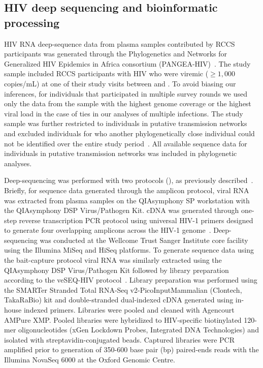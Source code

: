 \documentclass[10pt,letterpaper]{article}
\newcommand{\var}[1]{\DTLfetch{\mydata}{labels}{#1}{vals}}
\begin{document}
\subsection{HIV deep sequencing and bioinformatic processing}
HIV RNA deep-sequence data from plasma samples contributed by RCCS participants was generated through the Phylogenetics and Networks for Generalized HIV Epidemics in Africa consortium (PANGEA-HIV)~\cite{pillay2015,abeler-dorner2019}. The study sample included RCCS participants with HIV who were viremic ($\ge1,000$ copies/mL) at one of their study visits between \var{min_survey_date} and \var{max_survey_date}. To avoid biasing our inferences, for individuals that participated in multiple survey rounds we used only the data from the sample with the highest genome coverage or the highest viral load in the case of ties in our analyses of multiple infections. The study sample was further restricted to individuals in putative transmission networks and excluded individuals for who another phylogenetically close individual could not be identified over the entire study period~\cite{monod2024}. All available sequence data for individuals in putative transmission networks was included in phylogenetic analyses. \par

Deep-sequencing was performed with two protocols (), as previously described~\cite{monod2024}. Briefly, for sequence data generated through the amplicon protocol, viral RNA was extracted from plasma samples on the QIAsymphony SP workstation with the QIAsymphony DSP Virus/Pathogen Kit. cDNA was generated through one-step reverse transcription PCR protocol using universal HIV-1 primers designed to generate four overlapping amplicons across the HIV-1 genome~\cite{gall2012}. Deep-sequencing was conducted at the Wellcome Trust Sanger Institute core facility using the Illumina MiSeq and HiSeq platforms. To generate sequence data using the bait-capture protocol viral RNA was similarly extracted using the QIAsymphony DSP Virus/Pathogen Kit followed by library preparation according to the veSEQ-HIV protocol~\cite{bonsall2020}. Library preparation was performed using the SMARTer Stranded Total RNA-Seq v2-PicoInputMammalian (Clontech, TakaRaBio) kit and double-stranded dual-indexed cDNA generated using in-house indexed primers. Libraries were pooled and cleaned with Agencourt AMPure XMP. Pooled libraries were hybridized to HIV-specific biotinylated 120-mer oligonucleotides (xGen Lockdown Probes, Integrated DNA Technologies) and isolated with streptavidin-conjugated beads. Captured libraries were PCR amplified prior to generation of 350-600 base pair (bp) paired-ends reads with the Illumina NovaSeq 6000 at the Oxford Genomic Centre. \par
\end{document}
